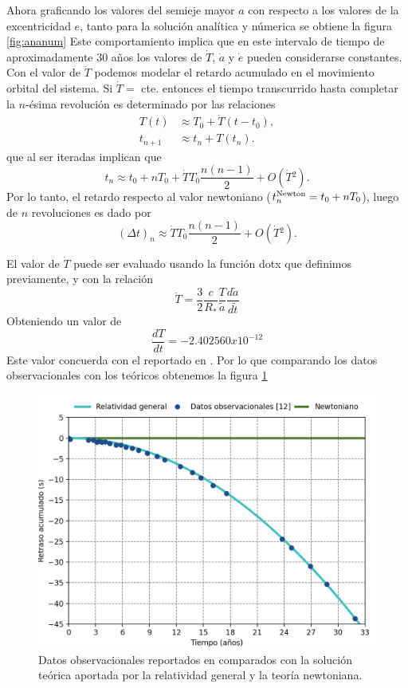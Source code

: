 Ahora graficando los valores del semieje mayor $a$ con respecto a los valores de la excentricidad $e$, tanto para la solución analítica y númerica se obtiene la figura
\ref{fig:ananum}
Este comportamiento implica que en este intervalo de tiempo de aproximadamente 30 años los valores de $\dot{T}$, $\dot{a}$ y $\dot{e}$ pueden considerarse constantes. Con el valor de $\dot{T}$ podemos modelar el retardo acumulado en el movimiento orbital del sistema. Si $\dot{T}=$ cte. entonces el tiempo transcurrido hasta completar la $n$-ésima revolución es determinado por las relaciones
\begin{align*}
T(t)&\approx T_0 + \dot{T}(t-t_0),\\
t_{n+1}& \approx t_n + T(t_n).
\end{align*}
que al ser iteradas implican que
\begin{equation*}
t_n \approx t_0+nT_0+\dot{T}T_0\frac{n(n-1)}{2}+O(\dot{T}{}^2).
\end{equation*}
Por lo tanto, el retardo respecto al valor newtoniano ($t_n^{\rm Newton}=t_0+nT_0$), luego de $n$ revoluciones es dado por
\begin{equation*}
(\Delta t)_n \approx \dot{T}T_0\frac{n(n-1)}{2}+O(\dot{T}{}^2).
\end{equation*}

El valor de $\dot{T}$ puede ser evaluado usando la función \textcolor{def}{dotx} que definimos previamente, y con la relación
\begin{equation*}
\dot{T}=\frac{3}{2}\frac{c}{R_\ast}\frac{T}{\tilde{a}}\frac{d\tilde{a}}{d\tilde{t}}
\end{equation*}
Obteniendo un valor de 
\begin{equation*}
    \frac{dT}{dt}=-2.402560x10^{-12}
\end{equation*}
Este valor concuerda con el reportado en \cite{Weisberg2010}. Por lo que comparando los datos observacionales con los teóricos obtenemos la figura \ref{fig:exp}
\begin{figure}[H]
    \centering
    \includegraphics[scale=0.70]{images/exp.png}
    \caption{Datos observacionales reportados en \cite{Weisberg2010} comparados con la solución teórica aportada por la relatividad general y la teoría newtoniana.}
    \label{fig:exp}
\end{figure}